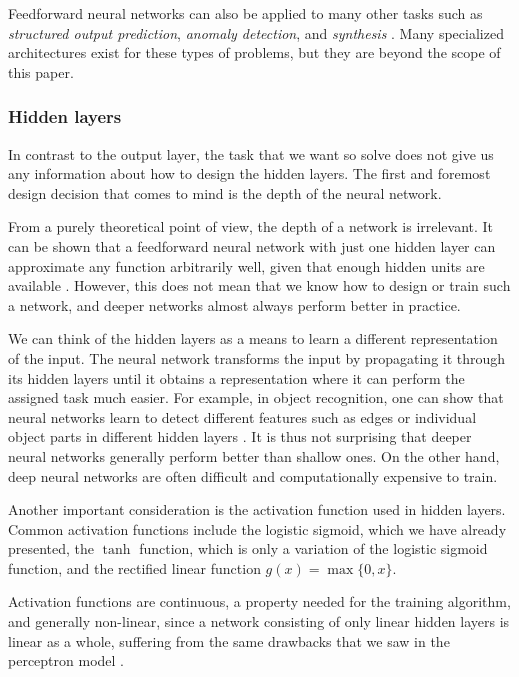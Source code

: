 Feedforward neural networks can also be applied to many other tasks such as \emph{structured output prediction}, \emph{anomaly detection}, and \emph{synthesis} \cite[Ch.\,5,\,pp.\,96-100]{DBLP:books/daglib/0040158}. Many specialized architectures exist for these types of problems, but they are beyond the scope of this paper.
\subsubsection{Hidden layers}
In contrast to the output layer, the task that we want so solve does not give us any information about how to design the hidden layers. The first and foremost design decision that comes to mind is the depth of the neural network. 

From a purely theoretical point of view, the depth of a network is irrelevant. It can be shown that a feedforward neural network with just one hidden layer can approximate any function arbitrarily well, given that enough hidden units are available \cite{DBLP:journals/nn/HornikSW89,DBLP:journals/mcss/Cybenko89}. However, this does not mean that we know how to design or train such a network, and deeper networks almost always perform better in practice.

We can think of the hidden layers as a means to learn a different representation of the input. The neural network transforms the input by propagating it through its hidden layers until it obtains a representation where it can perform the assigned task much easier. For example, in object recognition, one can show that neural networks learn to detect different features such as edges or individual object parts in different hidden layers \cite{DBLP:conf/eccv/ZeilerF14}. It is thus not surprising that deeper neural networks generally perform better than shallow ones. On the other hand, deep neural networks are often difficult and computationally expensive to train.

Another important consideration is the activation function used in hidden layers. Common activation functions include the logistic sigmoid, which we have already presented, the $\tanh$ function, which is only a variation of the logistic sigmoid function, and the rectified linear function $g(x) = \max\{0,x\}$.

Activation functions are continuous, a property needed for the training algorithm, and generally non-linear, since a network consisting of only linear hidden layers is linear as a whole, suffering from the same drawbacks that we saw in the perceptron model \cite[Ch.\,6,\,p.\,190]{DBLP:books/daglib/0040158}.

